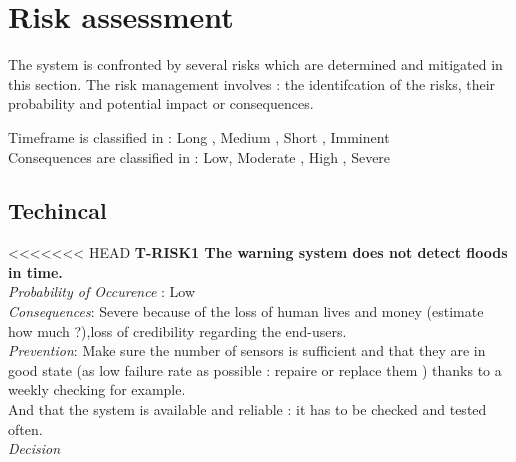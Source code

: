 \section{Risk assessment}
The system is confronted by several risks which are determined and mitigated in this section.
The risk management involves : the identifcation of the risks, their probability and potential impact or consequences.

Timeframe is classified in : Long , Medium , Short , Imminent \\
Consequences are classified in : Low, Moderate , High , Severe \\

\subsection{Techincal}

<<<<<<< HEAD
	\textbf{ T-RISK1 The warning system does not detect floods in time.} \\
	\textit{Probability of Occurence} : Low \\ %
	\textit{Consequences}: Severe because of the loss of human lives and money (estimate how much ?),loss of credibility regarding the end-users.\\
	\textit{Prevention}: Make sure the number of sensors is sufficient and that they are in good state (as low failure rate as possible : repaire or replace them ) thanks to a weekly checking for example. \\
	And that the system is available and reliable : it has to be checked and tested often.\\
	\textit{Decision} \\
	

